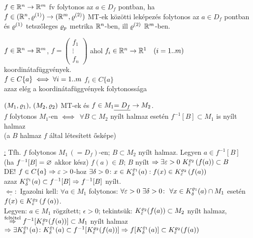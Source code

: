 \begin{de}
  $f\in \mathbb{R}^n\to \mathbb{R}^m$ fv folytonos az $a\in D_f$ pontban, ha\\ $f\in
  (\mathbb{R}^n,\varrho^{(1)})\to(\mathbb{R}^m,\varrho^{(2)}) $ MT-ek közötti leképezés
  folytonos az $a\in D_f$ pontban és $\varrho^{(1)}$ tetszőleges $\varrho_p$
  metrika $\mathbb{R}^n$-ben, ill $\varrho^{(2)}$ $\mathbb{R}^m$-ben.
\end{de}
\begin{te}
  $f\in \mathbb{R}^n\to \mathbb{R}^m$, $f = \left(
  \begin{array}{c}
    f_1\\\vdots\\f_n\end{array}\right)$  ahol $f_i\in
    \mathbb{R}^n\to\mathbb{R}^1\quad (i=1..m)$ koordinátafüggvények.\\
    $f\in C\{a\} \iff \forall i=1..m$ $f_i\in C\{a\}$\\
    azaz elég a koordinátafüggvények folytonossága
\end{te}

\begin{te}
  $(M_1,\varrho_1),\,(M_2,\varrho_2)$ MT-ek és $f\in M_1 \underline{=D_f}\to
  M_2$.\\
  $f$ folytonos $M_1$-en $\iff$ $\forall B\subset M_2$ nyílt
  halmaz esetén $f^{-1}[B]\subset M_1$ is nyílt halmaz\\
  (a $B$ halmaz $f$ által létesített ősképe)
\end{te}
\begin{biz}
  \underline{\nn:} Tfh. $f$ folytonos $M_1\,(=D_f)$-en; $B\subset
  M_2$ nyílt halmaz. Legyen  $a\in f^{-1}[B]$ (ha $f^{-1}[B]=\varnothing$
  akkor kész)
  \nn $f(a) \in B$; $B$ nyílt $\Rightarrow \exists \varepsilon>0\
  K_\varepsilon^{\varrho_2} \left(f(a)\right)\subset B$\\
  DE! $f\in C\{a\}\Rightarrow \varepsilon>0$-hoz $\exists\delta>0\colon x\in
  K_\delta^{\varrho_1}(a): f(x) \in K_\varepsilon^{\varrho_2}
  \left(f(a)\right)$\\
  azaz $K_\delta^{\varrho_1}(a)\subset f^{-1}[B]\Rightarrow
  f^{-1}[B]$ nyílt.\\
  $\underline{\Leftarrow:}$ Igazolni kell: $\forall a \in M_1$
  folytonos: $\forall \varepsilon > 0\ \exists \delta > 0\colon\
  \forall x\in  K_\delta^{\varrho_1}(a)\cap M_1$ esetén\\
  $f(x)\in K_\varepsilon^{\varrho_2}\left(f\left(a\right)\right)$.\\
  Legyen: $a\in M_1$ rögzített; $\epsilon > 0$; tekintsük:
  $K_\varepsilon^{\varrho_2}(f(a))\subset M_2$ nyílt halmaz, 
  $\stackrel{\text{feltétel}}{\Rightarrow}\\f^{-1}[K_\varepsilon^{\varrho_2}(f(a))]
  \subset M_1$ nyílt halmaz $\Rightarrow \exists K_\delta^{\varrho_1}(a)\colon
  K_\delta^{\varrho_1}(a)\subset f^{-1}[K_\varepsilon^{\varrho_2}(f(a))] \Rightarrow\\
  f[K_\delta^{\varrho_1}(a)]\subset K_\varepsilon^{\varrho_2}(f(a)) $
\end{biz}

